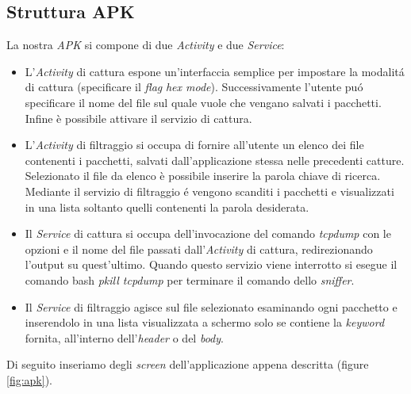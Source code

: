 \documentclass[12pt]{article} %
\begin{document}
\newpage
\subsection{Struttura APK}
La nostra \textit{APK} si compone di due \textit{Activity} e due \textit{Service}:

\begin{itemize}
\item L'\textit{Activity} di cattura espone un'interfaccia semplice per impostare la modalit\'a di cattura (specificare il \textit{flag} \textit{hex mode}). Successivamente l'utente pu\'o specificare il nome del file sul quale vuole che vengano salvati i pacchetti. Infine è possibile attivare il servizio di cattura.
\item L'\textit{Activity} di filtraggio si occupa di fornire all'utente un elenco dei file contenenti i pacchetti, salvati dall'applicazione stessa nelle precedenti catture. Selezionato il file da elenco è possibile inserire la parola chiave di ricerca. Mediante il servizio di filtraggio \'e vengono scanditi i pacchetti e visualizzati in una lista soltanto quelli contenenti la parola desiderata.
\item Il \textit{Service} di cattura si occupa dell'invocazione del comando \textit{tcpdump} con le opzioni e il nome del file passati dall'\textit{Activity} di cattura, redirezionando l'output su quest'ultimo. Quando questo servizio viene interrotto si esegue il comando bash \textit{pkill tcpdump} per terminare il comando dello \textit{sniffer}. 
\item Il \textit{Service} di filtraggio agisce sul file selezionato esaminando ogni pacchetto e inserendolo in una lista visualizzata a schermo solo se contiene la \textit{keyword} fornita, all'interno dell'\textit{header} o del \textit{body}.
\end{itemize}
 
Di seguito inseriamo degli \textit{screen} dell'applicazione appena descritta (figure \ref{fig:apk}).
 
\end{document}
